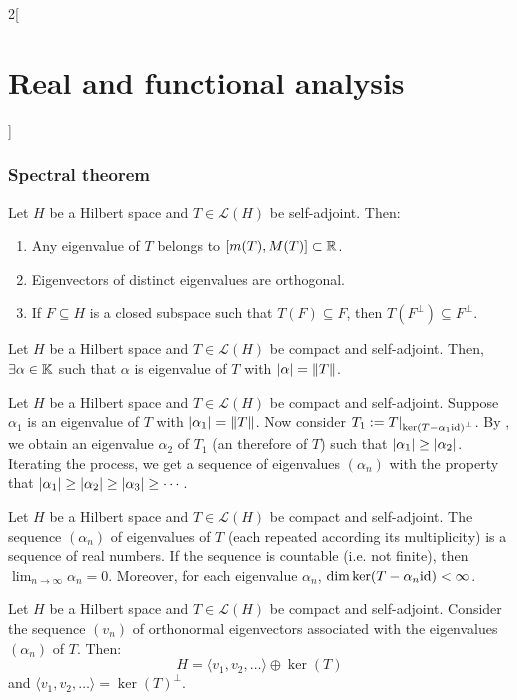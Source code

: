 \documentclass[../../../main_math.tex]{subfiles}
\begin{document}
\begin{multicols}{2}[\section{Real and functional analysis}]
  \subsubsection{Spectral theorem}
  \begin{proposition}
    Let $H$ be a Hilbert space and $T\in\mathcal{L}(H)$ be self-adjoint. Then:
    \begin{enumerate}
      \item Any eigenvalue of $T$ belongs to $[m(T),M(T)]\subset\mathbb{R}$.
      \item Eigenvectors of distinct eigenvalues are orthogonal.
      \item If $F\subseteq H$ is a closed subspace such that $T(F)\subseteq F$, then $T(F^\perp)\subseteq F^\perp$.
    \end{enumerate}
  \end{proposition}
  \begin{theorem}\label{RFA:spectraltheorem}
    Let $H$ be a Hilbert space and $T\in\mathcal{L}(H)$ be compact and self-adjoint. Then, $\exists \alpha\in \mathbb{K}$ such that $\alpha$ is eigenvalue of $T$ with $\abs{\alpha}=\left\|T\right\|$.
  \end{theorem}
  \begin{corollary}
    Let $H$ be a Hilbert space and $T\in\mathcal{L}(H)$ be compact and self-adjoint. Suppose $\alpha_1$ is an eigenvalue of $T$ with $\abs{\alpha_1}=\left\|T\right\|$. Now consider $T_1:=T|_{{\ker(T-\alpha_1\mathrm{id})}^\perp}$. By , we obtain an eigenvalue $\alpha_2$ of $T_1$ (an therefore of $T$) such that $\abs{\alpha_1}\geq \abs{\alpha_2}$. Iterating the process, we get a sequence of eigenvalues $(\alpha_n)$ with the property that $\abs{\alpha_1}\geq \abs{\alpha_2}\geq\abs{\alpha_3}\geq\cdots$.
  \end{corollary}
  \begin{theorem}
    Let $H$ be a Hilbert space and $T\in\mathcal{L}(H)$ be compact and self-adjoint. The sequence $(\alpha_n)$ of eigenvalues of $T$ (each repeated according its multiplicity) is a sequence of real numbers. If the sequence is countable (i.e. not finite), then $\displaystyle\lim_{n\to\infty}\alpha_n=0$. Moreover, for each eigenvalue $\alpha_n$, $\dim\ker(T-\alpha_n\mathrm{id})<\infty$.
  \end{theorem}
  \begin{lemma}
    Let $H$ be a Hilbert space and $T\in\mathcal{L}(H)$ be compact and self-adjoint. Consider the sequence $(v_n)$ of orthonormal eigenvectors associated with the eigenvalues $(\alpha_n)$ of $T$. Then: $$H=\langle v_1,v_2,\ldots\rangle\oplus \ker(T)$$ and $\langle v_1,v_2,\ldots\rangle={\ker(T)}^\perp$.

\end{lemma}
\end{multicols}
\end{document}
